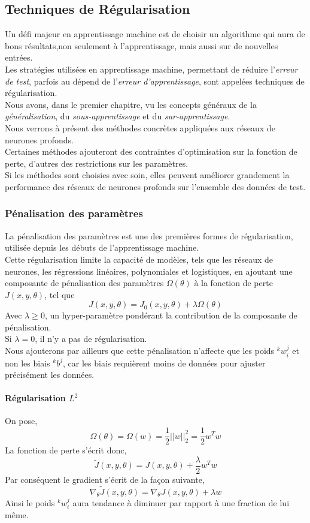 \documentclass[10pt,a4paper]{report}
\newcommand{\lexp}[1]{\phantom{}^{#1}}
\newcommand{\elem}[4]{\lexp{#2}#1^{#3}_{#4}}
\begin{document}
		\subsection{Techniques de Régularisation}
		Un défi majeur en apprentissage machine est de choisir un algorithme qui aura de bons résultats,non seulement à l'apprentissage, mais aussi sur de nouvelles entrées.\\
		Les stratégies utilisées en apprentissage machine, permettant de réduire l'\emph{erreur de test}, parfois au dépend de l'\emph{erreur d'apprentissage}, sont appelées techniques de régularisation.\\
		Nous avons, dans le premier chapitre, vu les concepts généraux de la \emph{généralisation}, du \emph{sous-apprentissage} et du \emph{sur-apprentissage}.\\
		Nous verrons à présent des méthodes concrètes appliquées aux réseaux de neurones profonds.\\
		Certaines méthodes ajouteront des contraintes d'optimisation sur la fonction de perte, d'autres des restrictions sur les paramètres.\\
		Si les méthodes sont choisies avec soin, elles peuvent améliorer grandement la performance des réseaux de neurones profonds sur l'ensemble des données de test.
			\subsubsection{Pénalisation des paramètres}
			La pénalisation des paramètres est une des premières formes de régularisation, utilisée depuis les débuts de l'apprentissage machine.\\
			Cette régularisation limite la capacité de modèles, tels que les réseaux de neurones, les régressions linéaires, polynomiales et logistiques, en ajoutant une composante de pénalisation des paramètres $\Omega(\theta)$ à la fonction de perte $J(x,y,\theta)$, tel que
			$$J(x,y,\theta) = J_0(x,y,\theta) + \lambda \Omega(\theta)$$
			Avec $\lambda \geq 0$, un hyper-paramètre pondérant la contribution de la composante de pénalisation.\\
			Si $\lambda = 0$, il n'y a pas de régularisation.\\
			Nous ajouterons par ailleurs que cette pénalisation n'affecte que les poids $\elem{w}{k}{j}{i}$ et non les biais $\elem{b}{k}{j}{}$, car les biais requièrent moins de données pour ajuster précisément les données.\\
				\paragraph{Régularisation $L^2$}
				On pose, $$\Omega(\theta) = \Omega(w) = \frac{1}{2} ||w||_2^2 = \frac{1}{2} w^T w$$
				La fonction de perte s'écrit donc,
				$$\tilde{J}(x,y,\theta) = J(x,y,\theta) + \frac{\lambda}{2} w^T w$$
				Par conséquent le gradient s'écrit de la façon suivante,
				$$\nabla_\theta \tilde{J}(x,y,\theta) = \nabla_\theta J(x,y,\theta) + \lambda w$$
				Ainsi le poids $\elem{w}{k}{j}{i}$ aura tendance à diminuer par rapport à une fraction de lui même.
\end{document}
